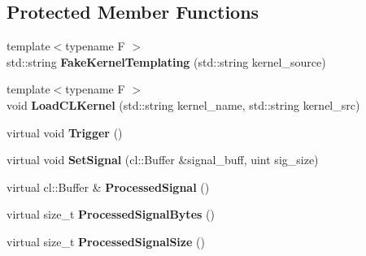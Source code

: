\subsection*{Protected Member Functions}
\begin{DoxyCompactItemize}
\item 
{\footnotesize template$<$typename F $>$ }\\std\+::string {\bfseries Fake\+Kernel\+Templating} (std\+::string kernel\+\_\+source)\hypertarget{classjaspl_1_1ocl_1_1_task_item_aebceb791e8b1dbe70af39047d8fdae21}{}\label{classjaspl_1_1ocl_1_1_task_item_aebceb791e8b1dbe70af39047d8fdae21}

\item 
{\footnotesize template$<$typename F $>$ }\\void {\bfseries Load\+C\+L\+Kernel} (std\+::string kernel\+\_\+name, std\+::string kernel\+\_\+src)\hypertarget{classjaspl_1_1ocl_1_1_task_item_a02894b39d1d7bfba0ebc43105754b466}{}\label{classjaspl_1_1ocl_1_1_task_item_a02894b39d1d7bfba0ebc43105754b466}

\item 
virtual void {\bfseries Trigger} ()\hypertarget{classjaspl_1_1ocl_1_1_task_item_a186aa96ac98ce8bb8c63818e8b33e3fa}{}\label{classjaspl_1_1ocl_1_1_task_item_a186aa96ac98ce8bb8c63818e8b33e3fa}

\item 
virtual void {\bfseries Set\+Signal} (cl\+::\+Buffer \&signal\+\_\+buff, uint sig\+\_\+size)\hypertarget{classjaspl_1_1ocl_1_1_task_item_a906407a36a6dfb930b37eabaa612cea3}{}\label{classjaspl_1_1ocl_1_1_task_item_a906407a36a6dfb930b37eabaa612cea3}

\item 
virtual cl\+::\+Buffer \& {\bfseries Processed\+Signal} ()\hypertarget{classjaspl_1_1ocl_1_1_task_item_af607becf93865c5d3d8f3df6ef87f867}{}\label{classjaspl_1_1ocl_1_1_task_item_af607becf93865c5d3d8f3df6ef87f867}

\item 
virtual size\+\_\+t {\bfseries Processed\+Signal\+Bytes} ()\hypertarget{classjaspl_1_1ocl_1_1_task_item_ac82006308e53c6e42144d253bde9b535}{}\label{classjaspl_1_1ocl_1_1_task_item_ac82006308e53c6e42144d253bde9b535}

\item 
virtual size\+\_\+t {\bfseries Processed\+Signal\+Size} ()\hypertarget{classjaspl_1_1ocl_1_1_task_item_aface585662048bfa00cda3292e9d9273}{}\label{classjaspl_1_1ocl_1_1_task_item_aface585662048bfa00cda3292e9d9273}


\end{DoxyCompactItemize}
